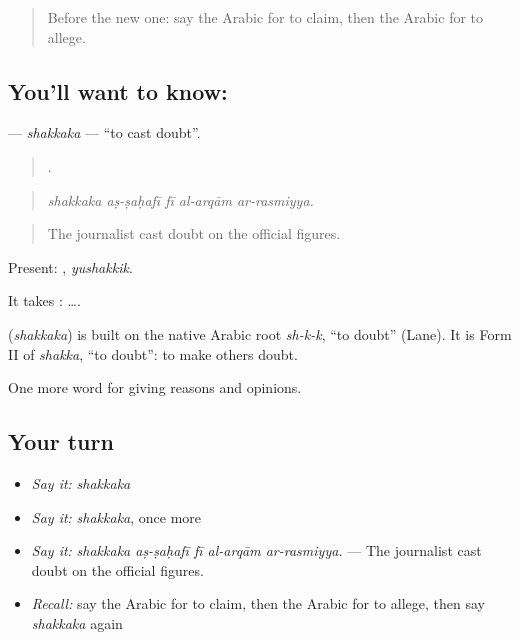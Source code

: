 \label{lesson:AR-C366-shakkaka}



\begin{quote}
Before the new one: say the Arabic for to claim, then the Arabic for to allege.
\end{quote}

\subsection*{You'll want to know: }
\textbf{} — \emph{shakkaka} — \textquotedblleft{}to cast doubt\textquotedblright{}.

\begin{quote}
    .
\end{quote}

\begin{quote}
\emph{shakkaka aṣ-ṣaḥafī fī al-arqām ar-rasmiyya.}
\end{quote}

\begin{quote}
The journalist cast doubt on the official figures.
\end{quote}

Present: , \emph{yushakkik}.

It takes :   ….

\begin{cousinweb}
\textbf{} (\emph{shakkaka}) is built on the native Arabic root \emph{sh-k-k}, \textquotedblleft{}to doubt\textquotedblright{} (Lane). It is Form II of \emph{shakka}, \textquotedblleft{}to doubt\textquotedblright{}: to make others doubt.
\end{cousinweb}

\begin{grammarlens}[title={What you've built}]
One more word for giving reasons and opinions.
\end{grammarlens}

\subsection*{Your turn}
\begin{itemize}
\raggedright
  \item \emph{Say it:} \emph{shakkaka}
  \item \emph{Say it:} \emph{shakkaka}, once more
  \item \emph{Say it:} \emph{shakkaka aṣ-ṣaḥafī fī al-arqām ar-rasmiyya.} — The journalist cast doubt on the official figures.
  \item \emph{Recall:} say the Arabic for to claim, then the Arabic for to allege, then say \emph{shakkaka} again
\end{itemize}

